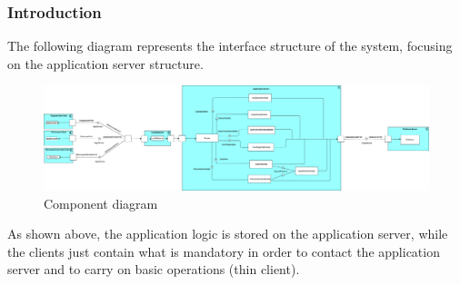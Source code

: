 \subsubsection{Introduction}
The following diagram represents the interface structure of the system, focusing on the application server structure. \newline
\begin{figure}[h!]
	\centering
	\includegraphics[width=\textwidth]{Images/component_diagram_beta}
	\caption{Component diagram}
\end{figure}

As shown above, the application logic is stored on the application server, while the clients just contain what is mandatory in order to contact the application server and to carry on basic operations  (thin client).\\
